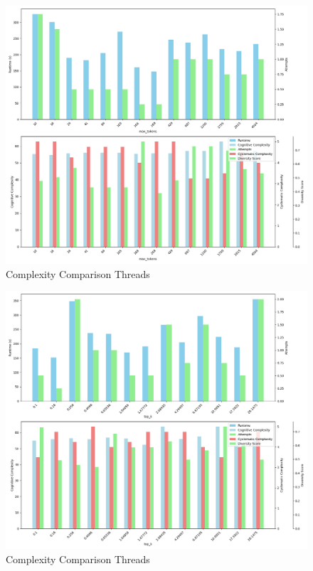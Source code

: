 \documentclass[12pt]{extarticle}
\begin{document}
\begin{figure}[h!]
\centering
\includegraphics[width=0.8\linewidth]{Images/Hyperparam_max_tokens_Comparison.png}
\caption{Complexity Comparison Threads}
\label{fig:Complexity_Comparison_Threads}
\end{figure}

\begin{figure}[h!]
\centering
\includegraphics[width=0.8\linewidth]{Images/Hyperparam_top_k_Comparison.png}
\caption{Complexity Comparison Threads}
\label{fig:Complexity_Comparison_Threads}
\end{figure}
\end{document}

